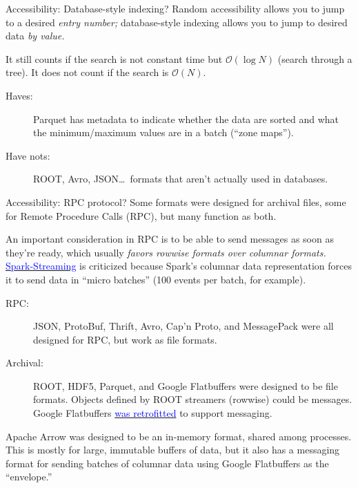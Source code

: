 \documentclass[aspectratio=169]{beamer}
\begin{document}
\begin{frame}{Accessibility: Database-style indexing?}
\vspace{0.5 cm}
Random accessibility allows you to jump to a desired {\it entry number;} database-style indexing allows you to jump to desired data {\it by value.}

\vfill
It still counts if the search is not constant time but $\mathcal{O}(\log N)$ (search through a tree). It does not count if the search is $\mathcal{O}(N)$.

\begin{description}
\item[Haves:] Parquet has metadata to indicate whether the data are sorted and what the minimum/maximum values are in a batch (``zone maps'').
\item[Have nots:] ROOT, Avro, JSON\ldots\ formats that aren't actually used in databases.
\end{description}
\end{frame}

\begin{frame}{Accessibility: RPC protocol?}
\vspace{0.5 cm}
Some formats were designed for archival files, some for Remote Procedure Calls (RPC), but many function as both.

\vspace{0.25 cm}

An important consideration in RPC is to be able to send messages as soon as they're ready, which usually {\it favors rowwise formats over columnar formats.} \href{http://sqlstream.com/2015/03/5-reasons-why-spark-streamings-batch-processing-of-data-streams-is-not-stream-processing/}{\textcolor{blue}{Spark-Streaming}} is criticized because Spark's columnar data representation forces it to send data in ``micro batches'' (100 events per batch, for example).

\begin{description}
\item[RPC:] JSON, ProtoBuf, Thrift, Avro, Cap'n Proto, and MessagePack were all designed for RPC, but work as file formats.
\item[Archival:] ROOT, HDF5, Parquet, and Google Flatbuffers were designed to be file formats. Objects defined by ROOT streamers (rowwise) could be messages. Google Flatbuffers \href{https://github.com/google/flatbuffers/issues/3898}{\textcolor{blue}{was retrofitted}} to support messaging.
\end{description}

Apache Arrow was designed to be an in-memory format, shared among processes. This is mostly for large, immutable buffers of data, but it also has a messaging format for sending batches of columnar data using Google Flatbuffers as the ``envelope.''
\end{frame}
\end{document}
